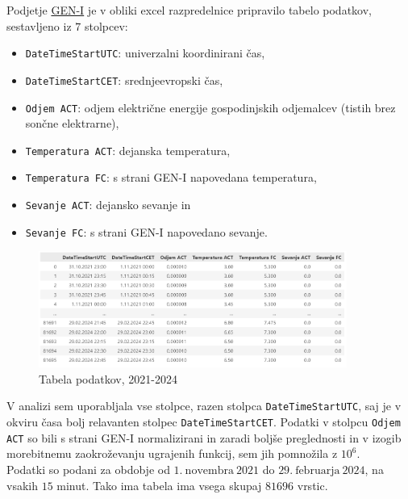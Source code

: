 \documentclass[a4paper, 11pt]{article}
\begin{document}
\noindent Podjetje \href{https://gen-i.si/}{GEN-I} je v obliki excel razpredelnice pripravilo tabelo podatkov, sestavljeno iz $7$ stolpcev:
\begin{itemize}
    \item  \texttt{DateTimeStartUTC}: univerzalni koordinirani čas,
    \item  \texttt{DateTimeStartCET}: srednjeevropski čas,
    \item  \texttt{Odjem ACT}: odjem električne energije gospodinjskih odjemalcev (tistih brez sončne elektrarne),
    \item  \texttt{Temperatura ACT}: dejanska temperatura, 
    \item  \texttt{Temperatura FC}: s strani GEN-I napovedana temperatura,
    \item  \texttt{Sevanje ACT}: dejansko sevanje in
    \item  \texttt{Sevanje FC}: s strani GEN-I napovedano sevanje. 
\end{itemize}

\begin{figure}[h!]
    \centering
    \caption{Tabela podatkov, 2021-2024}\par\medskip
    \includegraphics[width=0.9\textwidth]{tabela.png}
\end{figure}

\noindent V analizi sem uporabljala vse stolpce, razen stolpca \texttt{DateTimeStartUTC}, saj je v 
okviru časa bolj relavanten stolpec \texttt{DateTimeStartCET}. Podatki v stolpcu \texttt{Odjem ACT} so bili
s strani GEN-I normalizirani in zaradi boljše preglednosti in v izogib morebitnemu zaokroževanju 
ugrajenih funkcij, sem jih pomnožila z  $10^6$. \\
Podatki so podani za obdobje od $1.~\text{novembra}~2021$ do $29.~\text{februarja}~2024$,
na vsakih $15$ minut. Tako ima tabela ima vsega skupaj $81696$ vrstic.

\end{document}
